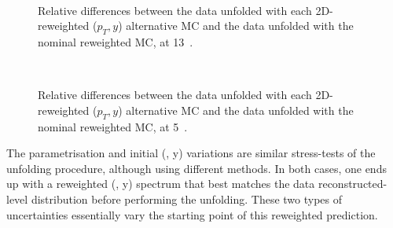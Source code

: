 \begin{figure}[h]
  \centering
   \\
  \caption{Relative differences between the data unfolded with each 2D-reweighted ($p_{T}, y$) alternative MC and the data unfolded with the nominal reweighted MC, at 13~\TeV.}
  \label{fig:Wbias_unc_MC13}
\end{figure}

\begin{figure}[h]
  \centering
   \\
  \caption{Relative differences between the data unfolded with each 2D-reweighted ($p_{T}, y$) alternative MC and the data unfolded with the nominal reweighted MC, at 5~\TeV.}
  \label{fig:Wbias_unc_MC5}
\end{figure}

The parametrisation and initial (\ptw, y) variations are similar stress-tests of the unfolding procedure, although using different methods. In both cases, one ends up with a reweighted (\ptw, y) spectrum that best matches the data reconstructed-level distribution before performing the unfolding. These two types of uncertainties essentially vary the starting point of this reweighted prediction.



